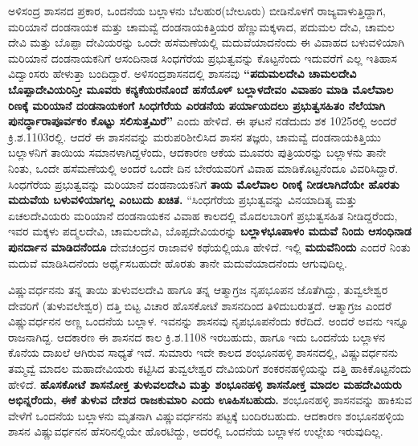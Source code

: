 ಅಳಿಸಂದ್ರ ಶಾಸನದ ಪ್ರಕಾರ, ಒಂದನೆಯ ಬಲ್ಲಾಳನು ಬೆಲಹುರ(ಬೇಲೂರು) ಬೀಡಿನೊಳಗೆ ರಾಜ್ಯವಾಳುತ್ತಿದ್ದಾಗ, ಮರಿಯಾನೆ ದಂಡನಾಯಕ ಮತ್ತು ಚಾಮವ್ವೆ ದಂಡನಾಯಕಿತ್ತಿಯರ ಹೆಣ್ಣುಮಕ್ಕಳಾದ, ಪದುಮಲ ದೇವಿ, ಚಾಮಲ ದೇವಿ ಮತ್ತು ಬೊಪ್ಪಾ ದೇವಿಯರನ್ನು ಒಂದೇ ಹಸೆಮಣೆಯಲ್ಲಿ ಮದುವೆಯಾದನೆಂದು ಈ ವಿವಾಹದ ಬಳುವಳಿಯಾಗಿ ಮರಿಯಾನೆ ದಂಡನಾಯಕನಿಗೆ ಆಸಂದಿನಾಡ ಸಿಂಧಗೆರೆಯ ಪ್ರಭುತ್ವವನ್ನು ಕೊಟ್ಟನೆಂದು ಇದುವರೆಗೆ ಎಲ್ಲ ಇತಿಹಾಸ ವಿದ್ವಾಂಸರು ಹೇಳುತ್ತಾ ಬಂದಿದ್ದಾರೆ. ಅಳಿಸಂದ್ರಶಾಸನದಲ್ಲಿ ಶಾಸನವು \textbf{“ಪದುಮಲದೇವಿ ಚಾಮಲದೇವಿ ಬೊಪ್ಪಾದೇವಿಯರಿನ್ತೀ ಮೂವರು ಕನ್ಯಕೆಯರನೊಂದೆ ಹಸೆಯೊಳ್​ ಬಲ್ಲಾಳದೇವಂ ವಿವಾಹಂ ಮಾಡಿ ಮೊಲೆವಾಲ ರಿಣಕ್ಕೆ ಮರಿಯಾನೆ ದಂಡನಾಯಕಂಗೆ ಸಿಂಧಗೆರೆಯ ಎರಡನೆಯ ಪರ್ಯಾಯದಲು ಪ್ರಭುತ್ವಸಹಿತಂ ನೆಲೆಯಾಗಿ ಪುನರ್ದ್ಧಾರಾಪೂರ್ವಕಂ ಕೊಟ್ಟು ಸಲಿಸುತ್ತಮಿರೆ”} ಎಂದು ಹೇಳಿದೆ. ಈ ಘಟನೆ ನಡೆದುದು ಶಕ 1025ರಲ್ಲಿ ಅಂದರೆ ಕ್ರಿ.ಶ.1103ರಲ್ಲಿ. ಆದರೆ ಈ ಶಾಸನವನ್ನು ಮರುಪರಿಶೀಲಿಸಿದ ಶಾಸನ ತಜ್ಞರು, ಚಾಮವ್ವೆ ದಂಡನಾಯಕಿತ್ತಿಯು ಬಲ್ಲಾಳನಿಗೆ ತಾಯಿಯ ಸಮಾನಳಾಗಿದ್ದಳೆಂದು, ಆದಕಾರಣ ಆಕೆಯ ಮೂವರು ಪುತ್ರಿಯರನ್ನು ಬಲ್ಲಾಳನು ತಾನೇ ನಿಂತು, ಒಂದೇ ಹಸೆಮಣೆಯಲ್ಲಿ ಅಂದರೆ ಒಂದೇ ದಿನ ಬೇರೆಯವರಿಗೆ ವಿವಾಹ ಮಾಡಿಕೊಟ್ಟನೆಂದೂ ವಿವರಿಸಿದ್ದಾರೆ. ಸಿಂಧಗೆರೆಯ ಪ್ರಭುತ್ವವನ್ನು ಮರಿಯಾನೆ ದಂಡನಾಯಕನಿಗೆ \textbf{ತಾಯ ಮೊಲೆವಾಲ ರಿಣಕ್ಕೆ ನೀಡಲಾಗಿದೆಯೇ ಹೊರತು ಮದುವೆಯ ಬಳುವಳಿಯಾಗಲ್ಲ ಎಂಬುದು ಖಚಿತ.} “ಸಿಂಧಗೆರೆಯ ಪ್ರಭುತ್ವವನ್ನು ವಿನಯಾದಿತ್ಯ ಮತ್ತು ಏಚಲದೇವಿಯರು ಮರಿಯಾನೆ ದಂಡನಾಯಕನ ವಿವಾಹ ಕಾಲದಲ್ಲಿ ಮೊದಲಬಾರಿಗೆ ಪ್ರಭುತ್ವಸಹಿತ ನೀಡಿದ್ದರೆಂದು, ಇವರ ಮಕ್ಕಳು ಪದ್ಮಲದೇವಿ, ಚಾಮಲದೇವಿ, ಬೊಪ್ಪದೇವಿಯರನ್ನು \textbf{ಬಲ್ಲಾಳಭೂಪಾಳಂ ಮದುವೆ ನಿಂದು ಆಸಂಧಿನಾಡ ಪುನರ್ದಾನ ಮಾಡಿದನೆಂದೂ} ದೇವಚಂದ್ರನ ರಾಜಾವಳಿ ಕಥೆಯಲ್ಲಿಯೂ ಹೇಳಿದೆ. ಇಲ್ಲಿ \textbf{ಮದುವೆನಿಂದು} ಎಂದರೆ ನಿಂತು ಮದುವೆ ಮಾಡಿಸಿದನೆಂದು ಅರ್ಥೈಸಬಹುದೇ ಹೊರತು ತಾನೇ ಮದುವೆಯಾದನೆಂದು ಆಗುವುದಿಲ್ಲ.

ವಿಷ್ಣುವರ್ಧನನು ತನ್ನ ತಾಯಿ ತುಳುವಲದೇವಿ ಹಾಗೂ ತನ್ನ ಆತ್ಮಾಗ್ರಜ ನೃಪಭೂಪನ ಜೊತೆಗಿದ್ದು, ತುವ್ವಲೇಶ್ವರ ದೇವರಿಗೆ (ತುಳುವಲೇಶ್ವರ) ದತ್ತಿ ಬಿಟ್ಟ ವಿಚಾರ ಹೊಸಕೋಟೆ ಶಾಸನದಿಂದ ತಿಳಿದುಬರುತ್ತದೆ. ಆತ್ಮಾಗ್ರಜ ಎಂದರೆ ವಿಷ್ಣುವರ್ಧನನ ಅಣ್ಣ ಒಂದನೆಯ ಬಲ್ಲಾಳ. ಇವನನ್ನು ಶಾಸನವು ನೃಪಭೂಪನೆಂದು ಕರೆದಿದೆ. ಅಂದರೆ ಅವನು ಇನ್ನೂ ರಾಜನಾಗಿದ್ದ. ಆದಕಾರಣ ಈ ಶಾಸನದ ಕಾಲ ಕ್ರಿ.ಶ.1108 ಇರಬಹುದು, ಹಾಗೂ ಇದು ಒಂದನೆಯ ಬಲ್ಲಾಳನ ಕೊನೆಯ ದಾಖಲೆ ಆಗಿರುವ ಸಾಧ್ಯತೆ ಇದೆ. ಸುಮಾರು ಇದೇ ಕಾಲದ ಶಂಭೂನಹಳ್ಳಿ ಶಾಸನದಲ್ಲಿ, ವಿಷ್ಣುವರ್ಧನನು ತಮ್ಮವ್ವೆ ಮಾದಲ ಮಹಾದೇವಿಯರು ಕಟ್ಟಿಸಿದ ತುವ್ವಲೇಶ್ವರ ದೇವಿಯರಿಗೆ ಶಂಕರನಹಳ್ಳಿಯನ್ನು ದತ್ತಿ ಹಾಕಿಕೊಟ್ಟನೆಂದು ಹೇಳಿದೆ. \textbf{ಹೊಸಕೋಟೆ ಶಾಸನೋಕ್ತ ತುಳುವಲದೇವಿ ಮತ್ತು ಶಂಭೂನಹಳ್ಳಿ ಶಾಸನೋಕ್ತ ಮಾದಲ ಮಹದೇವಿಯರು ಅಭಿನ್ನರೆಂದು, ಈಕೆ ತುಳುವ ದೇಶದ ರಾಜಕುಮಾರಿ ಎಂದು ಊಹಿಸಬಹುದು.} ಶಂಭೂನಹಳ್ಳಿ ಶಾಸನವನ್ನು ಹಾಕಿಸುವ ವೇಳೆಗೆ ಒಂದನೆಯ ಬಲ್ಲಾಳನು ಮೃತನಾಗಿ ವಿಷ್ಣುವರ್ಧನನು ಪಟ್ಟಕ್ಕೆ ಬಂದಿರಬಹುದು. ಆದಕಾರಣ ಶಂಭೂನಹಳ್ಳಿಯ ಶಾಸನ ವಿಷ್ಣುವರ್ಧನನ ಹೆಸರಿನಲ್ಲಿಯೇ ಹೊರಟಿದ್ದು, ಅದರಲ್ಲಿ ಒಂದನೆಯ ಬಲ್ಲಾಳನ ಉಲ್ಲೇಖ ಇರುವುದಿಲ್ಲ.

